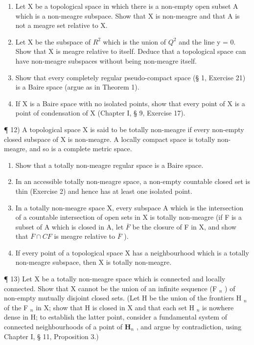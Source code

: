 \begin{enumerate}
\def\labelenumi{\arabic{enumi})}
\setcounter{enumi}{7}
\item
  Let X be a topological space in which there is a non-empty open subset A which is a non-meagre subspace. Show that X is non-meagre and that A is not a meagre set relative to X.
\item
  Let X be the subspace of \(R^{2}\) which is the union of \(Q^{2}\) and the line y = 0. Show that X is meagre relative to itself. Deduce that a topological space can have non-meagre subspaces without being non-meagre itself.
\item
  Show that every completely regular pseudo-compact space (§ 1, Exercise 21) is a Baire space (argue as in Theorem 1).
\item
  If X is a Baire space with no isolated points, show that every point of X is a point of condensation of X (Chapter I, § 9, Exercise 17).
\end{enumerate}

¶ 12) A topological space X is said to be totally non-meagre if every non-empty closed subspace of X is non-meagre. A locally compact space is totally non-meagre, and so is a complete metric space.

\begin{enumerate}
\def\labelenumi{\alph{enumi})}
\item
  Show that a totally non-meagre regular space is a Baire space.
\item
  In an accessible totally non-meagre space, a non-empty countable closed set is thin (Exercise 2) and hence has at least one isolated point.
\item
  In a totally non-meagre space X, every subspace A which is the intersection of a countable intersection of open sets in X is totally non-meagre (if F is a subset of A which is closed in A, let \(\overline{F}\) be the closure of F in X, and show that \(\overline{F} \cap C F\) is meagre relative to \(\overline{F}\) ).
\item
  If every point of a topological space X has a neighbourhood which is a totally non-meagre subspace, then X is totally non-meagre.
\end{enumerate}

¶ 13) Let X be a totally non-meagre space which is connected and locally connected. Show that X cannot be the union of an infinite sequence (F \(_{n}\) ) of non-empty mutually disjoint closed sets. (Let H be the union of the frontiers H \(_{n}\) of the F \(_{n}\) in X; show that H is closed in X and that each set H \(_{n}\) is nowhere dense in H; to establish the latter point, consider a fundamental system of connected neighbourhoods of a point of \(\mathbf{H}_n\) , and argue by contradiction, using Chapter I, § 11, Proposition 3.)

